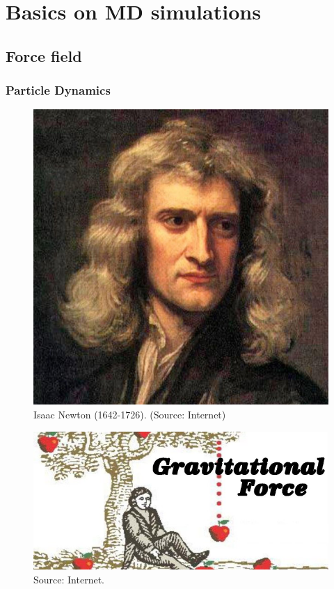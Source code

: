 \documentclass{beamer}
\begin{document}
\section{Basics on MD simulations }
\subsection{Force field} 

\begin{frame}\frametitle{Particle Dynamics}

\begin{minipage}[t]{0.4\linewidth}

\begin{figure}
\includegraphics[scale=0.16]{newton.jpg}
\caption{{\scriptsize  Isaac Newton (1642-1726). (Source: Internet)}}
\end{figure}

\end{minipage}
\hfill%
\begin{minipage}[t]{0.58\linewidth}
\begin{figure}
\includegraphics[scale=0.21]{Gravitational-Force.jpg}
\caption{{\scriptsize  Source: Internet.}}
\end{figure}
\end{minipage}


\end{frame}
\end{document}

